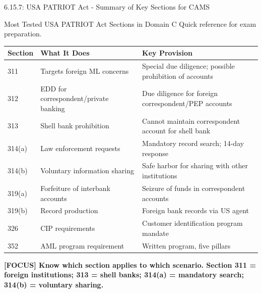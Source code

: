 \documentclass[11pt,a4paper]{beamer}
\newcommand{\examfocus}[1]{\textcolor{orange!80!black}{\textbf{[FOCUS] #1}}}
\begin{document}
\begin{frame}{6.15.7: USA PATRIOT Act - Summary of Key Sections for CAMS}
	\begin{block}{Most Tested USA PATRIOT Act Sections in Domain C}
		Quick reference for exam preparation.
	\end{block}
	\begin{tabular}{p{}|p{}|p{}}
		\hline
		\rowcolor{lightgray}
		\textbf{Section} & \textbf{What It Does} & \textbf{Key Provision} \\
		\hline
		311 & Targets foreign ML concerns & Special due diligence; possible prohibition of accounts \\
		\hline
		312 & EDD for correspondent/private banking & Due diligence for foreign correspondent/PEP accounts \\
		\hline
		313 & Shell bank prohibition & Cannot maintain correspondent account for shell bank \\
		\hline
		314(a) & Law enforcement requests & Mandatory record search; 14-day response \\
		\hline
		314(b) & Voluntary information sharing & Safe harbor for sharing with other institutions \\
		\hline
		319(a) & Forfeiture of interbank accounts & Seizure of funds in correspondent accounts \\
		\hline
		319(b) & Record production & Foreign bank records via US agent \\
		\hline
		326 & CIP requirements & Customer identification program mandate \\
		\hline
		352 & AML program requirement & Written program, five pillars \\
		\hline
	\end{tabular}
	\examfocus{Know which section applies to which scenario. Section 311 = foreign institutions; 313 = shell banks; 314(a) = mandatory search; 314(b) = voluntary sharing.}
\end{frame}

\end{document}
